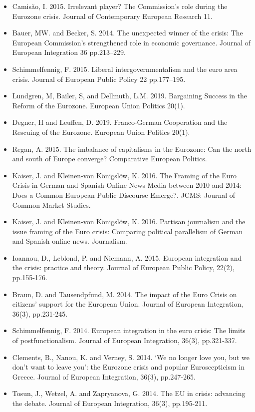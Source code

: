 \begin{itemize}
	\item Camisão, I. 2015. Irrelevant player? The Commission’s role during the Eurozone crisis. Journal of Contemporary European Research 11.
	\item Bauer, MW. and Becker, S. 2014. The unexpected winner of the crisis: The European Commission’s strengthened role in economic governance. Journal of European Integration 36 pp.213–229.
	\item Schimmelfennig, F. 2015. Liberal intergovernmentalism and the euro area crisis. Journal of European Public Policy 22 pp.177–195. 
	\item Lundgren, M, Bailer, S, and Dellmuth, L.M. 2019. Bargaining Success in the Reform of the Eurozone. European Union Politics 20(1).
	\item Degner, H and Leuffen, D. 2019. Franco-German Cooperation and the Rescuing of the Eurozone. European Union Politics 20(1).
	\item Regan, A. 2015. The imbalance of capitalisms in the Eurozone: Can the north and south of Europe converge? Comparative European Politics.
	\item Kaiser, J. and Kleinen-von K{\"o}nigsl{\"o}w, K. 2016. The Framing of the Euro Crisis in German and Spanish Online News Media between 2010 and 2014: Does a Common European Public Discourse Emerge?. JCMS: Journal of Common Market Studies.
	\item Kaiser, J. and Kleinen-von K{\"o}nigsl{\"o}w, K. 2016. Partisan journalism and the issue framing of the Euro crisis: Comparing political parallelism of German and Spanish online news. Journalism.
	\item Ioannou, D., Leblond, P. and Niemann, A. 2015. European integration and the crisis: practice and theory. Journal of European Public Policy, 22(2), pp.155-176.
	\item Braun, D. and Tausendpfund, M. 2014. The impact of the Euro Crisis on citizens’ support for the European Union. Journal of European Integration, 36(3), pp.231-245.
	\item Schimmelfennig, F. 2014. European integration in the euro crisis: The limits of postfunctionalism. Journal of European Integration, 36(3), pp.321-337.
	\item Clements, B., Nanou, K. and Verney, S. 2014. `We no longer love you, but we don’t want to leave you': the Eurozone crisis and popular Euroscepticism in Greece. Journal of European Integration, 36(3), pp.247-265.
	\item Tosun, J., Wetzel, A. and Zapryanova, G. 2014. The EU in crisis: advancing the debate. Journal of European Integration, 36(3), pp.195-211.

\end{itemize}
